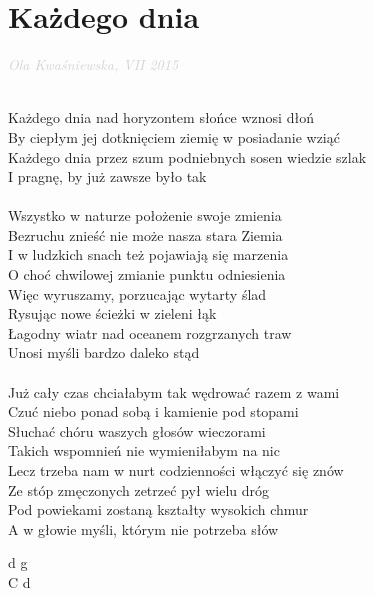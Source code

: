 \documentclass[a5paper, 10pt]{book}
\begin{document}
\newpage
\section{Każdego dnia}\textcolor{lightgray}{\textit{Ola Kwaśniewska, VII 2015}}\\~\\
\begin{minipage}[t]{0.8\textwidth}
  \hspace*{5mm}Każdego dnia nad horyzontem słońce wznosi dłoń		\\
  \hspace*{5mm}By ciepłym jej dotknięciem ziemię w posiadanie wziąć	\\
  \hspace*{5mm}Każdego dnia przez szum podniebnych sosen wiedzie szlak\\
  \hspace*{5mm}I pragnę, by już zawsze było tak\\
  \\
  Wszystko w naturze położenie swoje zmienia\\
  Bezruchu znieść nie może nasza stara Ziemia\\
  I w ludzkich snach też pojawiają się marzenia\\
  O choć chwilowej zmianie punktu odniesienia\\
  Więc wyruszamy, porzucając wytarty ślad\\
  Rysując nowe ścieżki w zieleni łąk\\
  Łagodny wiatr nad oceanem rozgrzanych traw\\
  Unosi myśli bardzo daleko stąd\\
  \\
  Już cały czas chciałabym tak wędrować razem z wami\\
  Czuć niebo ponad sobą i kamienie pod stopami\\
  Słuchać chóru waszych głosów wieczorami\\
  Takich wspomnień nie wymieniłabym na nic\\
  Lecz trzeba nam w nurt codzienności włączyć się znów\\
  Ze stóp zmęczonych zetrzeć pył wielu dróg\\
  Pod powiekami zostaną kształty wysokich chmur\\
  A w głowie myśli, którym nie potrzeba słów\\
\end{minipage}
\begin{minipage}[t]{0.2\textwidth}
  d g\\
  C d\\
\end{minipage}
\end{document}
